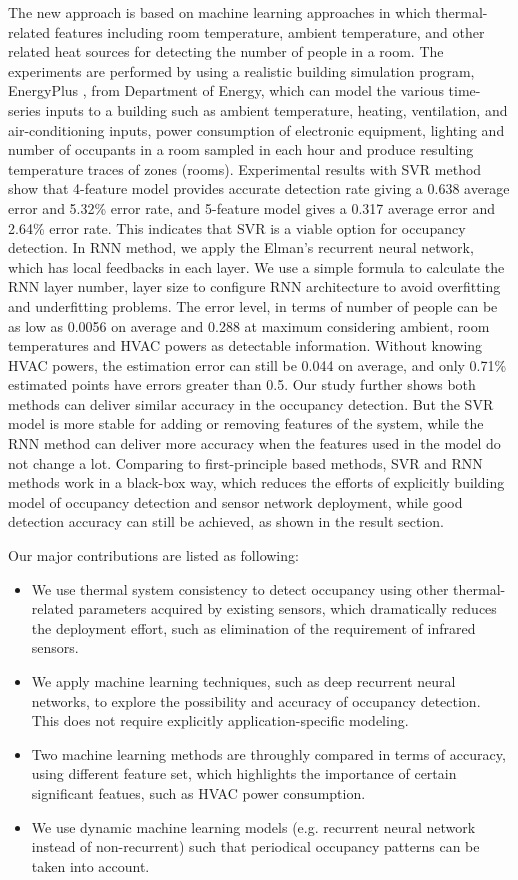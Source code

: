 \textcolor{feb18rev}{The new approach is based on machine learning approaches in which thermal-related features including room temperature, ambient temperature, and other related heat sources for detecting the number of people in a room. 
The experiments are performed by
using a realistic building simulation program, EnergyPlus
\cite{energyplus:2001vf}, from Department of Energy, which can model the
various time-series inputs to a building such as ambient temperature, heating,
ventilation, and air-conditioning inputs, power consumption of electronic
equipment, lighting and number of occupants in a room sampled in each hour and
produce resulting temperature traces of zones (rooms).}
Experimental results with SVR method show that 4-feature model provides accurate detection rate
giving a 0.638 average error and 5.32\% error rate, and 5-feature model gives
a 0.317 average error and 2.64\% error rate. This indicates that SVR is a
viable option for occupancy detection.  In RNN method, we apply the Elman's
recurrent neural network, which has local feedbacks in each layer. We use a
simple formula to calculate the RNN layer number, layer size to configure RNN
architecture to avoid overfitting and underfitting problems. The error level,
in terms of number of people can be as low as 0.0056 on average and 0.288 at
maximum considering ambient, room temperatures and HVAC powers as detectable
information. Without knowing HVAC powers, the estimation error can still be
0.044 on average, and only 0.71\% estimated points have errors greater than
0.5. Our study further shows both methods can deliver similar accuracy in the
occupancy detection. \textcolor{feb18rev}{But the SVR model is more stable for
adding or removing features of the system, while the RNN method can deliver 
more accuracy when the features used in the model do not change a lot. Comparing to
first-principle based methods, SVR and RNN methods work in a black-box way,
which reduces the efforts of explicitly building model of occupancy
detection and sensor network deployment, while good detection accuracy can
still be achieved, as shown in the result section.}\textcolor{feb18rev}{Our major contributions are listed as following:
\begin{itemize}
\item We use thermal system consistency to detect occupancy using other
    thermal-related parameters acquired by existing sensors, which dramatically
    reduces the deployment effort, such as elimination of the requirement
    of infrared sensors.
\item We apply machine learning techniques, such as deep recurrent neural
    networks, to explore the possibility and accuracy of occupancy detection.
    This does not require explicitly application-specific modeling.
\item Two machine learning methods are throughly compared in terms of accuracy,
    using different feature set, which highlights the importance of certain
    significant featues, such as HVAC power consumption.
\item We use dynamic machine learning models (e.g. recurrent neural network
    instead of non-recurrent) such that periodical occupancy patterns can be taken
    into account.
\end{itemize}
}

